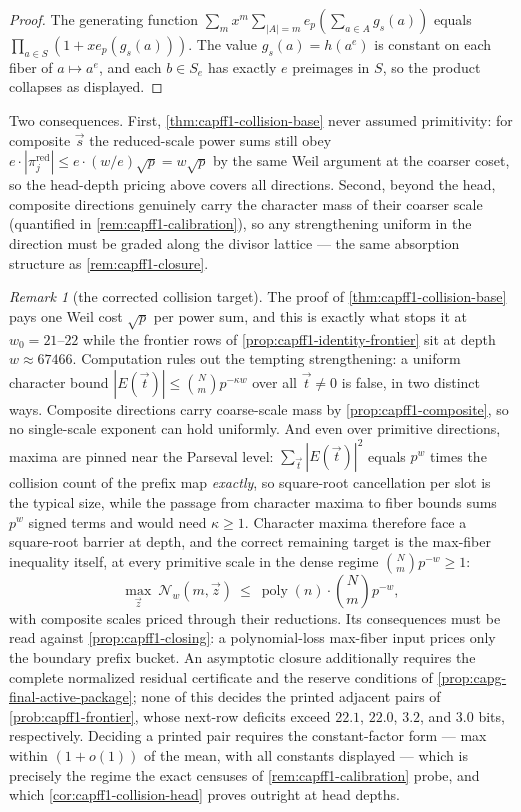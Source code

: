 \documentclass[11pt]{article}
\theoremstyle{definition}
\theoremstyle{remark}
\newtheorem{remark}[remark]{Remark}
\begin{document}
\begin{proof}
The generating function $\sum_m x^m\sum_{|A|=m}e_p(\sum_{a\in A}g_s(a))$ equals $\prod_{a\in S}(1+xe_p(g_s(a)))$.  The value $g_s(a)=h(a^e)$ is constant on each fiber of $a\mapsto a^e$, and each $b\in S_e$ has exactly $e$ preimages in $S$, so the product collapses as displayed.
\end{proof}

Two consequences.  First, \cref{thm:capff1-collision-base} never assumed primitivity: for composite $\vec s$ the reduced-scale power sums still obey $e\cdot|\pi^{\mathrm{red}}_j|\le e\cdot(w/e)\sqrt p=w\sqrt p$ by the same Weil argument at the coarser coset, so the head-depth pricing above covers all directions.  Second, beyond the head, composite directions genuinely carry the character mass of their coarser scale \textup{(quantified in \cref{rem:capff1-calibration})}, so any strengthening uniform in the direction must be graded along the divisor lattice --- the same absorption structure as \cref{rem:capff1-closure}.

\begin{remark}[the corrected collision target]\label{rem:capff1-collision-gap}
The proof of \cref{thm:capff1-collision-base} pays one Weil cost $\sqrt p$ per power sum, and this is exactly what stops it at $w_0=21$--$22$ while the frontier rows of \cref{prop:capff1-identity-frontier} sit at depth $w\approx67466$.  Computation rules out the tempting strengthening: a uniform character bound $|E(\vec t)|\le\binom Nm p^{-\kappa w}$ over all $\vec t\ne0$ is false, in two distinct ways.  Composite directions carry coarse-scale mass by \cref{prop:capff1-composite}, so no single-scale exponent can hold uniformly.  And even over primitive directions, maxima are pinned near the Parseval level: $\sum_{\vec t}|E(\vec t)|^2$ equals $p^w$ times the collision count of the prefix map \emph{exactly}, so square-root cancellation per slot is the typical size, while the passage from character maxima to fiber bounds sums $p^w$ signed terms and would need $\kappa\ge1$.  Character maxima therefore face a square-root barrier at depth, and the correct remaining target is the max-fiber inequality itself, at every primitive scale in the dense regime $\binom Nmp^{-w}\ge1$:
\[
        \max_{\vec z}\ \mathcal N_w(m,\vec z)\ \le\ \operatorname{poly}(n)\cdot\binom Nm p^{-w},
\]
with composite scales priced through their reductions.  Its consequences must be read against \cref{prop:capff1-closing}: a polynomial-loss max-fiber input prices only the boundary prefix bucket.  An asymptotic closure additionally requires the complete normalized residual certificate and the reserve conditions of \cref{prop:capg-final-active-package}; none of this decides the printed adjacent pairs of \cref{prob:capff1-frontier}, whose next-row deficits exceed $22.1$, $22.0$, $3.2$, and $3.0$ bits, respectively.  Deciding a printed pair requires the constant-factor form --- max within $(1+o(1))$ of the mean, with all constants displayed --- which is precisely the regime the exact censuses of \cref{rem:capff1-calibration} probe, and which \cref{cor:capff1-collision-head} proves outright at head depths.
\end{remark}
\end{document}

